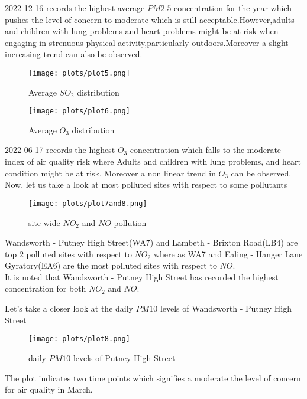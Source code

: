 \documentclass[]{article}
\begin{document}
2022-12-16 records the highest average $PM2.5$ concentration for the year which pushes the level of concern to moderate which is still acceptable.However,adults and children with lung problems and heart problems might be at risk when engaging in strenuous physical activity,particularly outdoors.Moreover a slight increasing trend can also be observed.
\pagebreak

\begin{figure}[H]
	\centering
	\texttt{[image: plots/plot5.png]}	
	\caption{Average $SO_2$ distribution}
	\label{plot 5}
\end{figure}

\begin{figure}[H]
	\centering
	\texttt{[image: plots/plot6.png]}	
	\caption{Average $O_3$ distribution}
	\label{plot 6}
\end{figure}
2022-06-17	records the highest $O_3$ concentration which falls to the moderate index of air quality risk where Adults and children with lung problems, and  heart condition might be at risk. Moreover a non linear trend in $O_3$ can be observed.\\
\newline
Now, let us take a look at most polluted sites with respect to some pollutants\\
\pagebreak
\begin{figure}[H]
	\centering
	\texttt{[image: plots/plot7and8.png]}	
	\caption{site-wide $NO_2$ and $NO$ pollution }
	\label{plot 7}
\end{figure}

Wandsworth - Putney High Street(WA7) and Lambeth - Brixton Road(LB4) are top 2 polluted sites with respect to $NO_2$ where as WA7 and Ealing - Hanger Lane Gyratory(EA6) are the most polluted sites with respect to $NO$.\\
 It is noted that Wandsworth - Putney High Street has recorded the highest concentration for both  $NO_2$ and $NO$.
 
Let's take a closer look at the daily $PM10$ levels of Wandsworth - Putney High Street\\
\begin{figure}[H]
	\centering
	\texttt{[image: plots/plot8.png]}	
	\caption{daily $PM10$ levels of Putney High Street}
	\label{plot 8}
\end{figure} 

The plot indicates two time points which signifies a moderate the level of concern for air quality in March.\\
\end{document}
